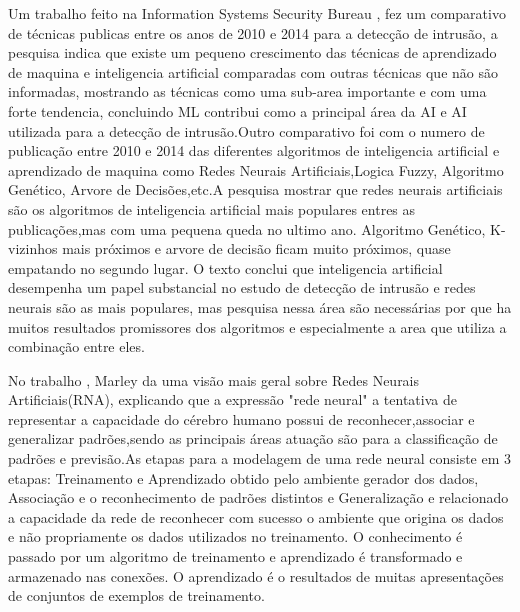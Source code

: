 \documentclass[
	12pt,				%
	openright,			%
	oneside,
	a4paper,			%
	english,			%
	french,				%
	spanish,			%
	brazil				%
	]{abntex2}
\begin{document}
Um trabalho feito na Information Systems Security Bureau \cite{Stampar}, fez um comparativo de técnicas publicas entre os anos de 2010 e 2014 para a detecção de intrusão, a pesquisa indica que existe um pequeno crescimento das técnicas de aprendizado de maquina e inteligencia artificial comparadas com outras técnicas que não são informadas, mostrando as técnicas como uma sub-area importante e com uma forte tendencia, concluindo ML contribui como a principal área da AI e AI utilizada para a detecção de intrusão.Outro comparativo foi com o numero de publicação entre 2010 e 2014 das diferentes algoritmos de inteligencia artificial e aprendizado de maquina como Redes Neurais Artificiais,Logica Fuzzy, Algoritmo Genético, Arvore de Decisões,etc.A pesquisa mostrar que redes neurais artificiais são os algoritmos de inteligencia artificial mais populares entres as publicações,mas com uma pequena queda no ultimo ano. Algoritmo Genético, K-vizinhos mais próximos e arvore de decisão ficam muito próximos, quase empatando no segundo lugar. O texto conclui que inteligencia artificial desempenha um papel substancial no estudo de detecção de intrusão e redes neurais são as mais populares, mas pesquisa nessa área são necessárias por que ha muitos resultados promissores dos algoritmos e especialmente a area que utiliza a combinação entre eles.

No trabalho \cite{Marley}, Marley da uma visão mais geral sobre Redes Neurais Artificiais(RNA), explicando que a expressão "rede neural" a tentativa de representar a capacidade do cérebro humano possui de reconhecer,associar e generalizar padrões,sendo as principais áreas atuação são para a classificação de padrões e previsão.As etapas para a modelagem de uma rede neural consiste em 3 etapas: Treinamento e Aprendizado obtido pelo ambiente gerador dos dados, Associação e o reconhecimento de padrões distintos e Generalização e relacionado a capacidade da rede de reconhecer com sucesso o ambiente que origina os dados e não propriamente os dados utilizados no treinamento. O conhecimento é passado por um algoritmo de treinamento e aprendizado é transformado e armazenado nas conexões. O aprendizado é o resultados de muitas apresentações de conjuntos de exemplos de treinamento.
\end{document}
